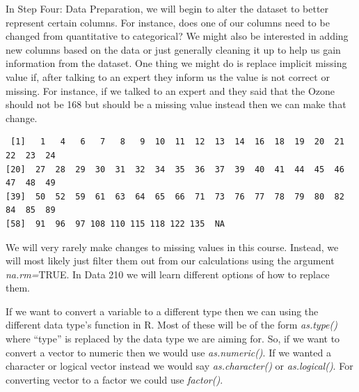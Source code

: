 \documentclass[
  letterpaper,
  DIV=11,
  numbers=noendperiod]{scrreprt}
\newenvironment{Shaded}{\begin{snugshade}}{\end{snugshade}}
\newcommand{\AttributeTok}[1]{\textcolor[rgb]{0.40,0.45,0.13}{#1}}
\newcommand{\ConstantTok}[1]{\textcolor[rgb]{0.56,0.35,0.01}{#1}}
\newcommand{\DecValTok}[1]{\textcolor[rgb]{0.68,0.00,0.00}{#1}}
\newcommand{\FunctionTok}[1]{\textcolor[rgb]{0.28,0.35,0.67}{#1}}
\newcommand{\NormalTok}[1]{\textcolor[rgb]{0.00,0.23,0.31}{#1}}
\newcommand{\OtherTok}[1]{\textcolor[rgb]{0.00,0.23,0.31}{#1}}
\newcommand{\SpecialCharTok}[1]{\textcolor[rgb]{0.37,0.37,0.37}{#1}}
\begin{document}
In Step Four: Data Preparation, we will begin to alter the dataset to
better represent certain columns. For instance, does one of our columns
need to be changed from quantitative to categorical? We might also be
interested in adding new columns based on the data or just generally
cleaning it up to help us gain information from the dataset. One thing
we might do is replace implicit missing value if, after talking to an
expert they inform us the value is not correct or missing. For instance,
if we talked to an expert and they said that the Ozone should not be 168
but should be a missing value instead then we can make that change.

\begin{Shaded}
\end{Shaded}

\begin{verbatim}
 [1]   1   4   6   7   8   9  10  11  12  13  14  16  18  19  20  21  22  23  24
[20]  27  28  29  30  31  32  34  35  36  37  39  40  41  44  45  46  47  48  49
[39]  50  52  59  61  63  64  65  66  71  73  76  77  78  79  80  82  84  85  89
[58]  91  96  97 108 110 115 118 122 135  NA
\end{verbatim}

We will very rarely make changes to missing values in this course.
Instead, we will most likely just filter them out from our calculations
using the argument \emph{na.rm=}TRUE. In Data 210 we will learn
different options of how to replace them.

If we want to convert a variable to a different type then we can using
the different data type's function in R. Most of these will be of the
form \emph{as.type()} where ``type'' is replaced by the data type we are
aiming for. So, if we want to convert a vector to numeric then we would
use \emph{as.numeric()}. If we wanted a character or logical vector
instead we would say \emph{as.character()} or \emph{as.logical()}. For
converting vector to a factor we could use \emph{factor()}.
\end{document}
